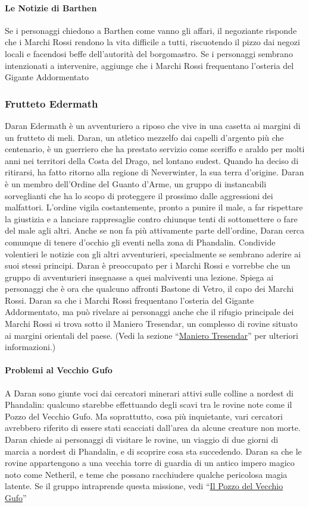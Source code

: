 \documentclass{article}
\begin{document}
\paragraph{Le Notizie di Barthen}
Se i personaggi chiedono a Barthen
come vanno gli affari, il negoziante risponde che i Marchi Rossi rendono la vita difficile a tutti, riscuotendo il pizzo dai
negozi locali e facendosi beffe dell'autorità del borgomastro. Se
i personaggi sembrano intenzionati a intervenire, aggiunge che
i Marchi Rossi frequentano l’osteria del Gigante Addormentato

\subsubsection{Frutteto Edermath}
\hypertarget{frutteto}{}
Daran Edermath è un avventuriero a riposo che vive in una
casetta ai margini di un frutteto di meli. Daran, un atletico
mezzelfo dai capelli d’argento più che centenario, è un
guerriero che ha prestato servizio come sceriffo e araldo per
molti anni nei territori della Costa del Drago, nel lontano
sudest. Quando ha deciso di ritirarsi, ha fatto ritorno alla
regione di Neverwinter, la sua terra d’origine.
Daran è un membro dell'Ordine del Guanto d’Arme,
un gruppo di instancabili sorveglianti che ha lo scopo di
proteggere il prossimo dalle aggressioni dei malfattori.
L'ordine vigila costantemente, pronto a punire il male, a
far rispettare la giustizia e a lanciare rappresaglie contro
chiunque tenti di sottomettere o fare del male agli altri. Anche
se non fa più attivamente parte dell'ordine, Daran cerca
comunque di tenere d'occhio gli eventi nella zona di Phandalin.
Condivide volentieri le notizie con gli altri avventurieri,
specialmente se sembrano aderire ai suoi stessi principi.
Daran è preoccupato per i Marchi Rossi e vorrebbe che
un gruppo di avventurieri insegnasse a quei malviventi una
lezione. Spiega ai personaggi che è ora che qualcuno affronti
Bastone di Vetro, il capo dei Marchi Rossi. Daran sa che i
Marchi Rossi frequentano l’osteria del Gigante Addormentato,
ma può rivelare ai personaggi anche che il rifugio principale
dei Marchi Rossi si trova sotto il Maniero Tresendar, un
complesso di rovine situato ai margini orientali del paese. (Vedi
la sezione “\hyperlink{maniero}{Maniero Tresendar}” per ulteriori informazioni.)
\paragraph{Problemi al Vecchio Gufo}
 A Daran sono giunte
voci dai cercatori minerari attivi sulle colline a nordest di
Phandalin: qualcuno starebbe effettuando degli scavi tra le
rovine note come il Pozzo del Vecchio Gufo. Ma soprattutto,
cosa più inquietante, vari cercatori avrebbero riferito di
essere stati scacciati dall'area da alcune creature non morte.
Daran chiede ai personaggi di visitare le rovine, un viaggio
di due giorni di marcia a nordest di Phandalin, e di scoprire
cosa sta succedendo. Daran sa che le rovine appartengono
a una vecchia torre di guardia di un antico impero magico
noto come Netheril, e teme che possano racchiudere qualche
pericolosa magia latente. Se il gruppo intraprende questa
missione, vedi “\hyperlink{gufo}{Il Pozzo del Vecchio Gufo}”
\end{document}
